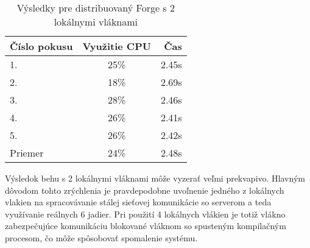 \begin{table}[H]
  \centering
  \begin{tabular}{| l || c | r |}
    \hline
    \v{C}\'{i}slo pokusu & Vyu\v{z}itie CPU & \v{C}as \\ \hline \hline
    1. & 25\% & 2.45s \\ \hline
    2. & 18\% & 2.69s \\ \hline
    3. & 28\% & 2.46s \\ \hline
    4. & 26\% & 2.41s \\ \hline
    5. & 26\% & 2.42s \\ \hline \hline
    Priemer & 24\% & 2.48s \\
    \hline
  \end{tabular}
  \caption{V\'{y}sledky pre distribuovan\'{y} Forge s 2 lok\'{a}lnymi vl\'{a}knami}
  \label{tbl:forge2}
\end{table}

Výsledok behu s 2 lokálnymi vláknami môže vyzerať veľmi prekvapivo. Hlavným dôvodom
tohto zrýchlenia je pravdepodobne uvoľnenie jedného z lokálnych vlakien na spracovávanie
stálej sieťovej komunikácie so serverom a teda využívanie reálnych 6 jadier. Pri použití
4 lokálnych vlákien je totiž vlákno zabezpečujúce komunikáciu blokované vláknom so spusteným
kompilačným procesom, čo môže spôsobovať spomalenie systému.
